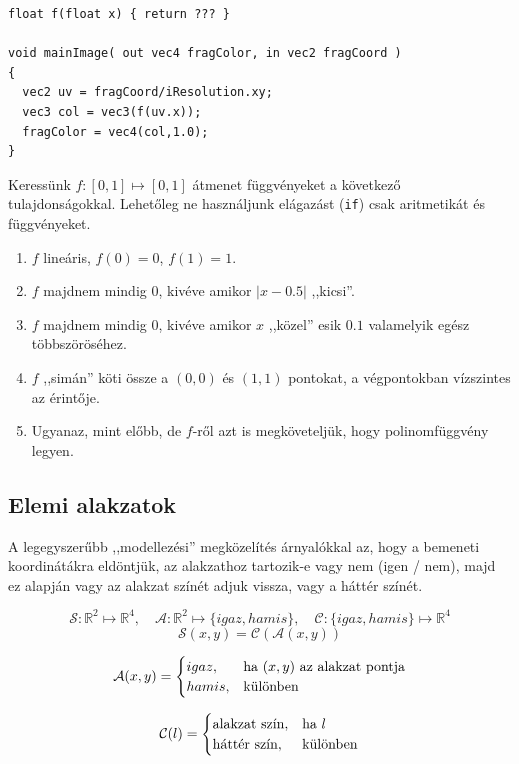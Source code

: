\begin{tcolorbox}[colback=yellow!5,colframe=yellow!50!black,title=Átmenetek]
 \begin{verbatim}
float f(float x) { return ??? }
    
void mainImage( out vec4 fragColor, in vec2 fragCoord )
{
  vec2 uv = fragCoord/iResolution.xy;
  vec3 col = vec3(f(uv.x));
  fragColor = vec4(col,1.0);
}
\end{verbatim}  
\end{tcolorbox}

Keressünk $f: [0, 1] \mapsto [0,1]$ átmenet függvényeket a következő tulajdonságokkal.
Lehetőleg ne használjunk elágazást (\texttt{if}) csak aritmetikát és függvényeket.

\begin{enumerate}
  \item $f$ lineáris, $f(0)=0$, $f(1)=1$.
  \item $f$ majdnem mindig 0, kivéve amikor $|x-0.5|$ ,,kicsi''.
  \item $f$ majdnem mindig 0, kivéve amikor $x$ ,,közel'' esik $0.1$ valamelyik egész többszöröséhez.
  \item $f$ ,,simán'' köti össze a $(0,0)$ és $(1,1)$ pontokat, a végpontokban vízszintes az érintője.
  \item Ugyanaz, mint előbb, de $f$-ről azt is megköveteljük, hogy polinomfüggvény legyen. 
\end{enumerate}

\subsection{Elemi alakzatok}

A legegyszerűbb ,,modellezési'' megközelítés árnyalókkal az, hogy a bemeneti koordinátákra
eldöntjük, az alakzathoz tartozik-e vagy nem (igen / nem), majd ez alapján vagy az
alakzat színét adjuk vissza, vagy a háttér színét.

\begin{tcolorbox}
  
  $$
  \mathcal{S}: \mathbb{R}^2 \mapsto \mathbb{R}^4,\quad
  \mathcal{A}: \mathbb{R}^2 \mapsto \{igaz, hamis\},\quad
  \mathcal{C}: \{igaz, hamis\} \mapsto \mathbb{R}^4
  $$
  $$\mathcal{S}(x, y) = \mathcal{C}(\mathcal{A}(x,y))$$

  $$\mathcal{A}(x,y) = 
    \begin{cases}
      igaz,  &\text{ha~} (x, y) \text{~az alakzat pontja}\cr
      hamis, &\text{különben}
    \end{cases}
  $$

  $$\mathcal{C}(l) = 
    \begin{cases}
      \text{alakzat szín},  &\text{ha~} l\cr
      \text{háttér szín}, &\text{különben}
    \end{cases}
  $$

  \end{tcolorbox}

